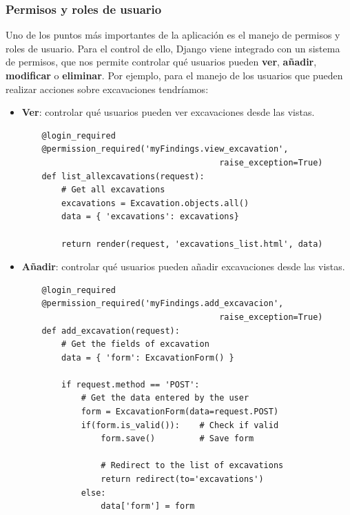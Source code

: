 \subsubsection{Permisos y roles de usuario}
Uno de los puntos más importantes de la aplicación es el manejo de permisos y roles de
usuario. Para el control de ello, Django viene integrado con un sistema de permisos,
que nos permite controlar qué usuarios pueden \textbf{ver}, \textbf{añadir}, \textbf{
modificar} o \textbf{eliminar}. Por ejemplo, para el manejo de los usuarios que pueden
realizar acciones sobre excavaciones tendríamos:

    \begin{itemize}
        \item \textbf{Ver}: controlar qué usuarios pueden ver excavaciones desde las
        vistas.
    
    \begin{verbatim}
    @login_required
    @permission_required('myFindings.view_excavation', 
                                        raise_exception=True)
    def list_allexcavations(request):
        # Get all excavations
        excavations = Excavation.objects.all()
        data = { 'excavations': excavations}
    
        return render(request, 'excavations_list.html', data)
    \end{verbatim}

        \item \textbf{Añadir}: controlar qué usuarios pueden añadir excavaciones
        desde las vistas.
    
    \begin{verbatim}
    @login_required
    @permission_required('myFindings.add_excavacion', 
                                        raise_exception=True)
    def add_excavation(request):
        # Get the fields of excavation
        data = { 'form': ExcavationForm() }
    
        if request.method == 'POST':
            # Get the data entered by the user
            form = ExcavationForm(data=request.POST)
            if(form.is_valid()):    # Check if valid
                form.save()         # Save form
    
                # Redirect to the list of excavations
                return redirect(to='excavations')
            else:
                data['form'] = form
    

\end{verbatim}
\end{itemize}
